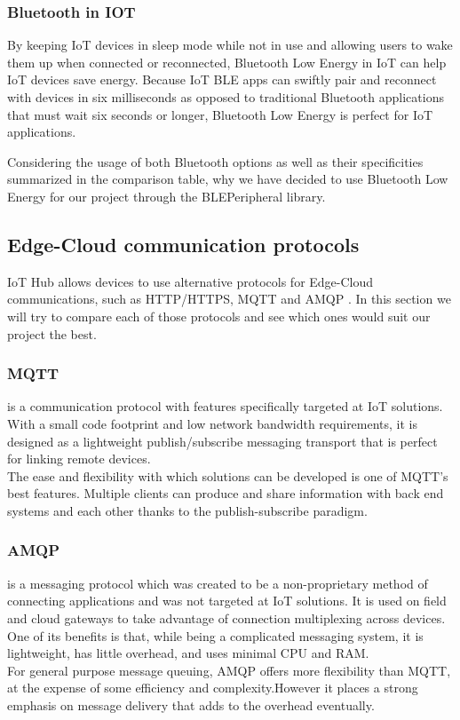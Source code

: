 \subsubsection{Bluetooth in IOT}
By keeping IoT devices in sleep mode while not in use and allowing users to wake them up when connected or reconnected, Bluetooth Low Energy in IoT can help IoT devices save energy. Because IoT BLE apps can swiftly pair and reconnect with devices in six milliseconds as opposed to traditional Bluetooth applications that must wait six seconds or longer, Bluetooth Low Energy is perfect for IoT applications.

Considering the usage of both Bluetooth options as well as their specificities summarized in the comparison table, why we have decided to use Bluetooth Low Energy for our project through the BLEPeripheral library.

\subsection{Edge-Cloud communication protocols}
IoT Hub allows devices to use alternative protocols for Edge-Cloud communications, such as HTTP/HTTPS, MQTT and AMQP \cite{b1}. In this section we will try to compare each of those protocols and see which ones would suit our project the best.

\subsubsection{MQTT} is a communication protocol with features specifically targeted at IoT solutions. With a small code footprint and low network bandwidth requirements, it is designed as a lightweight publish/subscribe messaging transport that is perfect for linking remote devices.\\
The ease and flexibility with which solutions can be developed is one of MQTT's best features. Multiple clients can produce and share information with back end systems and each other thanks to the publish-subscribe paradigm.

\subsubsection{AMQP} is a messaging protocol which was created to be a non-proprietary method of connecting applications and was not targeted at IoT solutions. It is used on field and cloud gateways to take advantage of connection multiplexing across devices. One of its benefits is that, while being a complicated messaging system, it is lightweight, has little overhead, and uses minimal CPU and RAM. \\
For general purpose message queuing, AMQP offers more flexibility than MQTT, at the expense of some efficiency and complexity.However it places a strong emphasis on message delivery that adds to the overhead eventually.

